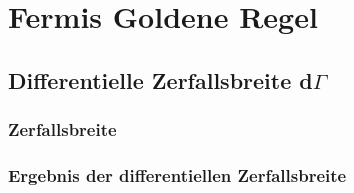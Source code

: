 \documentclass[hyperref={pdfpagelabels=false}]{beamer}
\begin{document}
\section{Fermis Goldene Regel}
\begin{frame}
\tableofcontents[currentsection]
\end{frame}
\subsection{Differentielle Zerfallsbreite d$\Gamma$}
 \begin{frame}
    \frametitle{Zerfallsbreite}
 \end{frame}

\begin{frame}
 \frametitle{Ergebnis der differentiellen Zerfallsbreite}
\end{frame}
\end{document}

